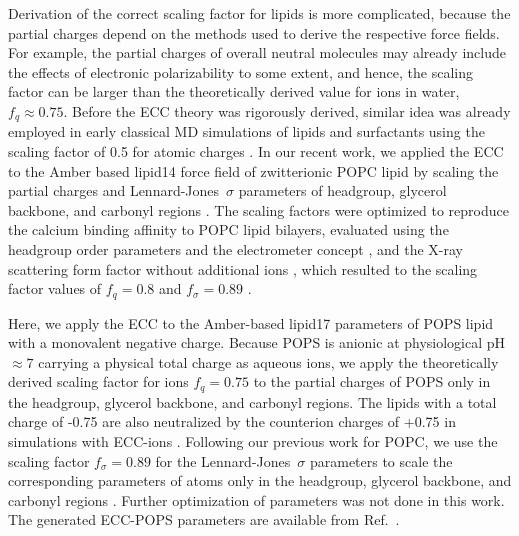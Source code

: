 \documentclass[journal=jpcbfk,manuscript=article]{achemso}
\begin{document}
Derivation of the correct scaling factor for lipids is more complicated, because
the partial charges depend on the methods used to derive the respective force fields.
For example, the partial charges of overall neutral molecules may already include the effects of electronic polarizability to some extent,
and hence, the scaling factor can be larger than the theoretically derived value for ions in water, $f_q \approx 0.75$.  
Before the ECC theory was rigorously derived, similar idea was already employed in early classical 
MD simulations of lipids and surfactants using the scaling factor of 0.5 for atomic charges  \cite{jonsson86,egberts94, berendsen1996}. 
In our recent work, we applied the ECC to the Amber based lipid14 force field of zwitterionic POPC lipid \cite{dickson14}
by scaling the partial charges and Lennard-Jones~$\sigma$ parameters of headgroup, glycerol backbone,
and carbonyl regions \cite{melcr18}. The scaling factors were optimized to reproduce 
the calcium binding affinity to POPC lipid bilayers, evaluated using the headgroup order parameters
and the electrometer concept \cite{akutsu81,altenbach84,seelig87,catte16}, and the X-ray scattering form factor
without additional ions \cite{kucerka11}, which resulted to the scaling factor values of $f_q = 0.8$ and $f_\sigma = 0.89$  \cite{melcr18}.

Here, we apply the ECC to the Amber-based lipid17 parameters \cite{lipid17-future} of POPS lipid with a monovalent negative charge.
Because POPS is anionic at physiological pH$\approx 7$ carrying a physical total charge as aqueous ions, 
we apply the theoretically derived scaling factor\cite{leontyev09} for
ions $f_q = 0.75$ to the partial charges of POPS 
only in the headgroup, glycerol backbone, and carbonyl regions. %
The lipids with a total charge of -0.75 are also neutralized
by the counterion charges of +0.75 in simulations with ECC-ions \cite{Pluharova2014, kohagen16, martinek17}.
Following our previous work for POPC, we use the scaling factor $f_\sigma = 0.89$ for the Lennard-Jones~$\sigma$ parameters 
to scale the corresponding parameters of atoms 
only in the headgroup, glycerol backbone, and carbonyl regions \cite{melcr18}. %
Further optimization of parameters was not done in this work. 
The generated ECC-POPS parameters are available from Ref.~. 
\end{document}
